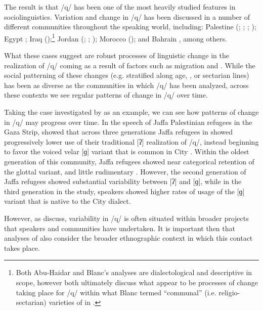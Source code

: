 \documentclass[output=paper]{langsci/langscibook}
\begin{document}
  The result is that /q/ has been one of the most heavily studied features in  sociolinguistics. Variation and change in /q/ has been discussed in a number of different communities throughout the  speaking world, including: Palestine (\citealt{AbdEl-Jawad1987}; \citealt{Al-Shareef2002}; \citealt{CotterHoresh2015}; \citealt{Cotter2016}); Egypt \citep{Haeri1997}; Iraq (\citealt{Blanc1964,Abu-Haidar1991});\footnote{Both Abu-Haidar and Blanc’s analyses are dialectological and descriptive in scope, however both ultimately discuss what appear to be processes of change taking place for /q/ within what Blanc termed “communal” (i.e. religio-sectarian) varieties of  in .}  Jordan (\citealt{AbdEl-Jawad1981}; \citealt{Al-Wer2007}; \citealt{Al-WerHerin2011}); Morocco (\citealt{Hachimi2007,Hachimi2012}); and Bahrain \citep{Holes1987}, among others. 

  What these cases suggest are robust processes of linguistic change in the realization of /q/ coming as a result of factors such as migration and . While the social patterning of these changes (e.g. stratified along age, , or sectarian lines) has been as diverse as the communities in which /q/ has been analyzed, across these contexts we see regular patterns of change in /q/ over time. 

  Taking the case investigated by \citet{Cotter2016} as an example, we can see how patterns of change in /q/ may progress over time. In the speech of Jaffa Palestinian refugees in the Gaza Strip, \citet{Cotter2016} showed that across three generations Jaffa refugees in  showed progressively lower use of their traditional [ʔ] realization of /q/, instead beginning to favor the voiced velar [ɡ] variant that is common in  City . Within the oldest generation of this community, Jaffa refugees showed near categorical retention of the glottal variant, and little rudimentary . However, the second generation of Jaffa refugees showed substantial variability between [ʔ] and [ɡ], while in the third generation in the study, speakers showed higher rates of usage of the [ɡ] variant that is native to the  City dialect. 

However, as \citet{CotterHoresh2015} discuss, variability in /q/ is often situated within broader  projects that speakers and communities have undertaken. It is important then that analyses of   also consider the broader ethnographic context in which this contact takes place. 
\end{document}
